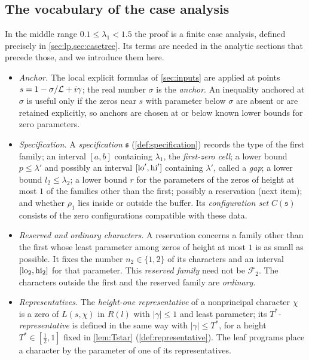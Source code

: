 \subsection{The vocabulary of the case analysis}\label{subsec:vocabulary}
In the middle range $0.1\le\lambda_1<1.5$ the proof is a finite case analysis, defined
precisely in \cref{sec:lp,sec:casetree}. Its terms are needed in the analytic sections that
precede those, and we introduce them here.
\begin{itemize}
  \item \emph{Anchor.} The local explicit formulas of \cref{sec:inputs} are applied at points
    $s=1-\sigma/\mathcal{L}+i\gamma$; the real number $\sigma$ is the \emph{anchor}. An inequality anchored
    at $\sigma$ is useful only if the zeros near $s$ with parameter below $\sigma$ are absent or are
    retained explicitly, so anchors are chosen at or below known lower bounds for zero parameters.
  \item \emph{Specification.} A \emph{specification} $\mathfrak s$ (\cref{def:specification})
    records the type of the first family; an interval $[a,b]$ containing $\lambda_1$, the
    \emph{first-zero cell}; a lower bound $p\le\lambda'$ and possibly an interval
    $[\mathrm{lo}',\mathrm{hi}']$ containing $\lambda'$, called a \emph{gap}; a lower bound $l_2\le\lambda_2$; a
    lower bound $r$ for the parameters of the zeros of height at most $1$ of the families other
    than the first; possibly a reservation (next item); and whether $\rho_1$ lies inside or
    outside the buffer. Its \emph{configuration set} $C(\mathfrak s)$ consists of the zero
    configurations compatible with these data.
  \item \emph{Reserved and ordinary characters.} A reservation concerns a family other than the
    first whose least parameter among zeros of height at most $1$ is as small as possible. It
    fixes the number $n_2\in\{1,2\}$ of its characters and an interval $[\mathrm{lo}_2,\mathrm{hi}_2]$ for that
    parameter. This \emph{reserved family} need not be $\mathcal F_2$. The characters outside the
    first and the reserved family are \emph{ordinary}.
  \item \emph{Representatives.} The \emph{height-one representative} of a nonprincipal character
    $\chi$ is a zero of $L(s,\chi)$ in $R(l)$ with $|\gamma|\le1$ and least parameter; its
    \emph{$T^*$-representative} is defined in the same way with $|\gamma|\le T^*$, for a height
    $T^*\in[\frac12,1]$ fixed in \cref{lem:Tstar} (\cref{def:representative}). The leaf programs
    place a character by the parameter of one of its representatives.

\end{itemize}
